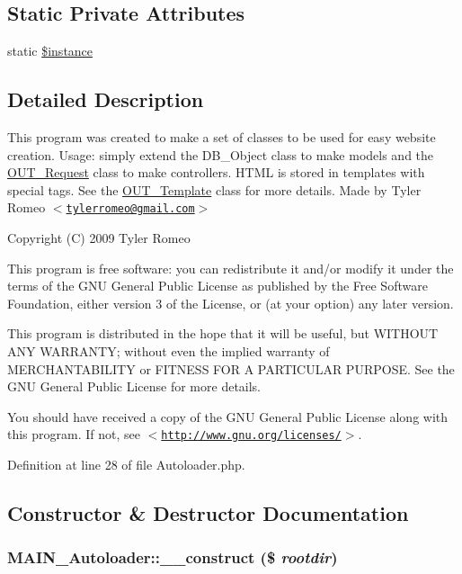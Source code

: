 \subsection*{Static Private Attributes}
\begin{DoxyCompactItemize}
\item 
static \hyperlink{classMAIN__Autoloader_a00cdc353ce3e2665f86e87e3abb8bf0a}{\$instance}
\end{DoxyCompactItemize}


\subsection{Detailed Description}
This program was created to make a set of classes to be used for easy website creation. Usage: simply extend the DB\_\-Object class to make models and the \hyperlink{classOUT__Request}{OUT\_\-Request} class to make controllers. HTML is stored in templates with special tags. See the \hyperlink{classOUT__Template}{OUT\_\-Template} class for more details. Made by Tyler Romeo $<$\href{mailto:tylerromeo@gmail.com}{\tt tylerromeo@gmail.com}$>$

Copyright (C) 2009 Tyler Romeo

This program is free software: you can redistribute it and/or modify it under the terms of the GNU General Public License as published by the Free Software Foundation, either version 3 of the License, or (at your option) any later version.

This program is distributed in the hope that it will be useful, but WITHOUT ANY WARRANTY; without even the implied warranty of MERCHANTABILITY or FITNESS FOR A PARTICULAR PURPOSE. See the GNU General Public License for more details.

You should have received a copy of the GNU General Public License along with this program. If not, see $<$\href{http://www.gnu.org/licenses/}{\tt http://www.gnu.org/licenses/}$>$. 

Definition at line 28 of file Autoloader.php.

\subsection{Constructor \& Destructor Documentation}
\hypertarget{classMAIN__Autoloader_a201bd218d1efdce335722cd1e60ef599}{
\subsubsection[{\_\-\_\-construct}]{\setlength{\rightskip}{0pt plus 5cm}MAIN\_\-Autoloader::\_\-\_\-construct (\$ {\em rootdir})}}
\label{dd/d71/classMAIN__Autoloader_a201bd218d1efdce335722cd1e60ef599}


